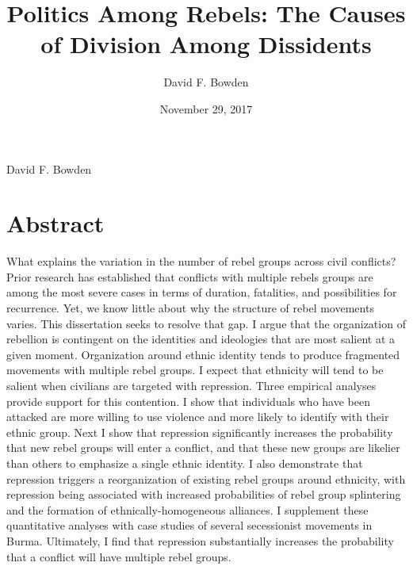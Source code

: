 \documentclass[12pt,]{book}
\title{Politics Among Rebels: The Causes of Division Among Dissidents}
\author{David F. Bowden}
\date{November 29, 2017}
\theoremstyle{definition}
\theoremstyle{definition}
\theoremstyle{definition}
\theoremstyle{remark}
\begin{document}
\pagestyle{plain}


\frontmatter


\hspace{0pt}
\vfill
\begin{center}
 David F. Bowden
\end{center}
\vfill\hspace{0pt}



\doublespacing


\hypertarget{abstract}{%
\chapter*{Abstract}\label{abstract}}

\setcounter{page}{2}

What explains the variation in the number of rebel groups across civil
conflicts? Prior research has established that conflicts with multiple
rebels groups are among the most severe cases in terms of duration,
fatalities, and possibilities for recurrence. Yet, we know little about
why the structure of rebel movements varies. This dissertation seeks to
resolve that gap. I argue that the organization of rebellion is
contingent on the identities and ideologies that are most salient at a
given moment. Organization around ethnic identity tends to produce
fragmented movements with multiple rebel groups. I expect that ethnicity
will tend to be salient when civilians are targeted with repression.
Three empirical analyses provide support for this contention. I show
that individuals who have been attacked are more willing to use violence
and more likely to identify with their ethnic group. Next I show that
repression significantly increases the probability that new rebel groups
will enter a conflict, and that these new groups are likelier than
others to emphasize a single ethnic identity. I also demonstrate that
repression triggers a reorganization of existing rebel groups around
ethnicity, with repression being associated with increased probabilities
of rebel group splintering and the formation of ethnically-homogeneous
alliances. I supplement these quantitative analyses with case studies of
several secessionist movements in Burma. Ultimately, I find that
repression substantially increases the probability that a conflict will
have multiple rebel groups.
\end{document}

